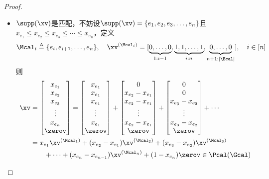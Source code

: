 \documentclass{ctexart}
\begin{document}
\begin{proof}
\begin{itemize}
        \item $\supp(\xv)$是匹配，不妨设$\supp(\xv) = \{ e_1, e_2, e_3, \ldots, e_n \}$且$x_{e_1} \le x_{e_2} \le x_{e_3} \le \cdots \le x_{e_n}$，定义
              \begin{align*}
                  \Mcal_i \triangleq \{ e_i, e_{i+1}, \ldots, e_n \}, \quad \xv^{(\Mcal_i)} = [\underbrace{0, \ldots, 0}_{1:i-1}, \underbrace{1, 1, \ldots, 1}_{i:n}, \underbrace{0, \ldots, 0}_{n+1:|\Ecal|}], \quad i \in [n]
              \end{align*}
              则
              \begin{align*}
                  \xv & = \begin{bmatrix}
                      x_{e_1} \\ x_{e_2} \\ x_{e_3} \\ \vdots \\ x_{e_n} \\ \zerov
                  \end{bmatrix} = \begin{bmatrix}
                      x_{e_1} \\ x_{e_1} \\ x_{e_1} \\ \vdots \\ x_{e_1} \\ \zerov
                  \end{bmatrix} + \begin{bmatrix}
                      0 \\ x_{e_2} - x_{e_1} \\ x_{e_2} - x_{e_1} \\ \vdots \\ x_{e_2} - x_{e_1} \\ \zerov
                  \end{bmatrix} + \begin{bmatrix}
                      0 \\ 0 \\ x_{e_3} - x_{e_2} \\ \vdots \\ x_{e_3} - x_{e_2} \\ \zerov
                  \end{bmatrix} + \cdots \\
                      & = x_{e_1} \xv^{(\Mcal_1)} + (x_{e_2} - x_{e_1}) \xv^{(\Mcal_2)} + (x_{e_3} - x_{e_2}) \xv^{(\Mcal_3)}                        \\
                      & \qquad + \cdots + (x_{e_n} - x_{e_{n-1}}) \xv^{(\Mcal_n)} + (1 - x_{e_n}) \zerov \in \Pcal (\Gcal)
              \end{align*}
    \end{itemize}
\end{proof}
\end{document}
